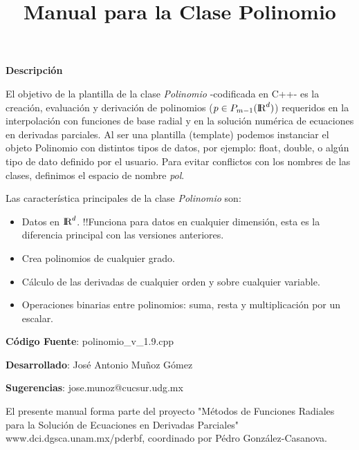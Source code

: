 \documentclass[a4paper,11pt]{article}
\newcommand \RR{\hbox{I\kern -.2em \hbox {R}}}
\begin{document}
\title{Manual para la Clase Polinomio}

\date{}
\maketitle

\noindent
\textbf{Descripci\'on}

El objetivo de la plantilla de la clase \textit{Polinomio} -codificada en C++- es la creaci\'on, 
evaluaci\'on y derivaci\'on de polinomios ($p \in P_{m-1}(\RR^d)$) requeridos en 
la interpolaci\'on con funciones de base radial y en la soluci\'on num\'erica de ecuaciones en 
derivadas parciales. Al ser una plantilla (template) podemos instanciar el objeto Polinomio
con distintos tipos de datos, por ejemplo: float, double, o alg\'un tipo de dato definido por
el usuario. Para evitar conflictos con los nombres de las clases, definimos el espacio de
nombre \textit{pol}.

Las caracter\'istica principales de la clase \textit{Polinomio} son:
\begin{itemize}
  \item Datos en $\RR^d$. !!Funciona para datos en cualquier dimensi\'on, esta es la diferencia
        principal con las versiones anteriores.
  \item Crea polinomios de cualquier grado.
  \item C\'alculo de las derivadas de cualquier orden y sobre cualquier variable.
  \item Operaciones binarias entre polinomios: suma, resta y multiplicaci\'on por un escalar.
\end{itemize}

\vspace{3mm}
\noindent
\textbf{C\'odigo Fuente}: polinomio\_v\_1.9.cpp

\noindent
\textbf{Desarrollado}: Jos\'e Antonio Mu{\~n}oz G\'omez

\noindent
\textbf{Sugerencias}: jose.munoz@cucsur.udg.mx

\vspace{3mm}
\footnotesize{
El presente manual forma parte del proyecto "M\'etodos de Funciones Radiales para la Soluci\'on
de Ecuaciones en Derivadas Parciales" www.dci.dgsca.unam.mx/pderbf, coordinado por  P\'edro
Gonz\'alez-Casanova.}
\end{document}
